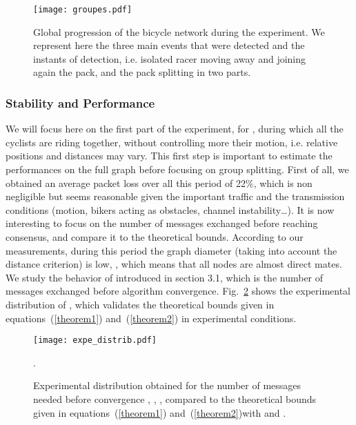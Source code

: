 \documentclass{sig-alternate}
\begin{document}
\begin{figure}[t]
\centering
\texttt{[image: groupes.pdf]}
\caption{Global progression of the bicycle network during the experiment. We represent here the three main events that were detected and the instants of detection, i.e. isolated racer moving away and joining again the pack, and the pack splitting in two parts.}
\label{fig:prog_expe}
\end{figure}

\subsubsection{Stability and Performance}
We will focus here on the first part of the experiment, for , during which all the cyclists are riding together, without controlling more their motion, i.e. relative positions and distances may vary. This first step is important to estimate the performances on the full graph before focusing on group splitting.
First of all, we obtained an average packet loss over all this period of 22\%, which is non negligible but seems reasonable given the important traffic and the transmission conditions (motion, bikers acting as obstacles, channel instability\ldots).
It is now interesting to focus on the number of messages exchanged before reaching consensus, and compare it to the theoretical bounds. According to our measurements, during this period the graph diameter (taking into account the distance criterion) is low, , which means that all nodes are almost direct mates.
We study the behavior of  introduced in section 3.1, which is the number of messages exchanged before algorithm convergence.
Fig.~\ref{fig:expe_distrib} shows the  experimental distribution of , which validates the theoretical bounds given in equations~(\ref{theorem1}) and~(\ref{theorem2}) in experimental conditions.




\begin{figure}[t]
\centering
\texttt{[image: expe\_distrib.pdf]}
\caption{Experimental distribution obtained for the number of messages needed before convergence , , , compared to the theoretical bounds given in equations~(\ref{theorem1}) and~(\ref{theorem2})with  and .}.
\label{fig:expe_distrib}
\end{figure}
\end{document}
